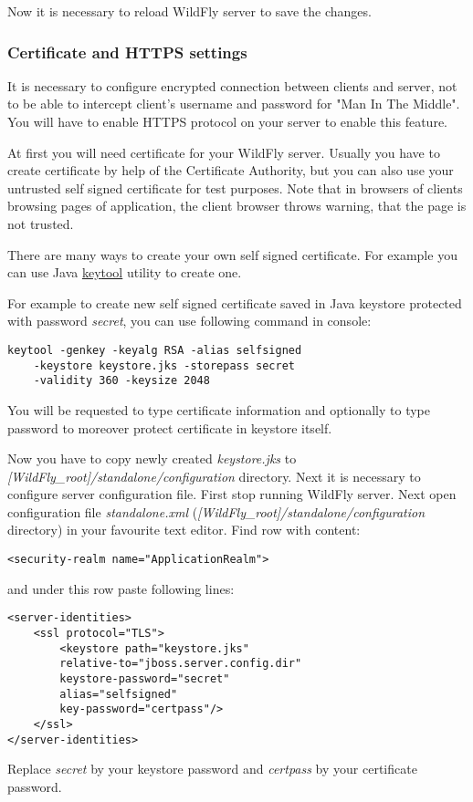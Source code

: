 \documentclass[12pt,a4paper]{article}
\begin{document}
Now it is necessary to reload WildFly server to save the changes.

\subsubsection{Certificate and HTTPS settings}
It is necessary to configure encrypted connection between clients and server, not to be able to intercept client's username and password for "Man In The Middle". You will have to enable HTTPS protocol on your server to enable this feature. 

At first you will need certificate for your WildFly server. Usually you have to create certificate by help of the Certificate Authority, but you can also use your untrusted self signed certificate for test purposes. Note that in browsers of clients browsing pages of application, the client browser throws warning, that the page is not trusted.

There are many ways to create your own self signed certificate. For example you can use Java \href{http://docs.oracle.com/javase/6/docs/technotes/tools/windows/keytool.html}{keytool} utility to create one. 

For example to create new self signed certificate saved in Java keystore protected with password \textit{secret}, you can use following command in console:
\begin{lstlisting}
keytool -genkey -keyalg RSA -alias selfsigned 
	-keystore keystore.jks -storepass secret 
	-validity 360 -keysize 2048
\end{lstlisting}
You will be requested to type certificate information and optionally to type password to moreover protect certificate in keystore itself. 

Now you have to copy newly created \textit{keystore.jks} to 
\\\textit{[WildFly\_root]/standalone/configuration} directory. Next it is necessary to configure server configuration file. First stop running WildFly server. Next open configuration file \textit{standalone.xml} (\textit{[WildFly\_root]/standalone/configuration} directory) in your favourite text editor. Find row with content:
\lstset{language=XML}
\begin{lstlisting}
<security-realm name="ApplicationRealm">
\end{lstlisting}
and under this row paste following lines:
\begin{lstlisting}
<server-identities>
	<ssl protocol="TLS">
		<keystore path="keystore.jks"
		relative-to="jboss.server.config.dir"
		keystore-password="secret" 
		alias="selfsigned"
		key-password="certpass"/>
	</ssl>
</server-identities>
\end{lstlisting}
Replace \textit{secret} by your keystore password and \textit{certpass} by your certificate password.
\end{document}
